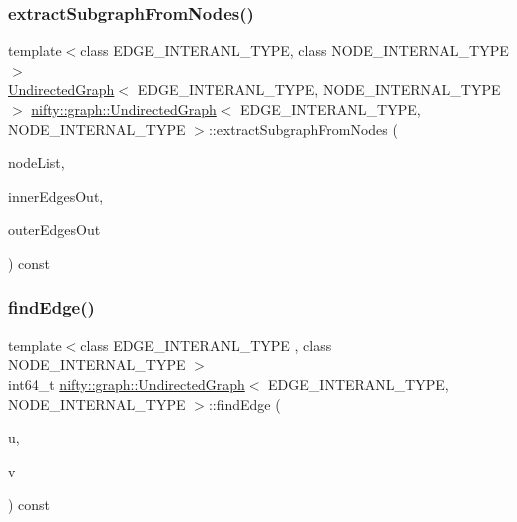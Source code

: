 \subsubsection{\texorpdfstring{extract\+Subgraph\+From\+Nodes()}{extractSubgraphFromNodes()}}
{\footnotesize\ttfamily template$<$class E\+D\+G\+E\+\_\+\+I\+N\+T\+E\+R\+A\+N\+L\+\_\+\+T\+Y\+PE, class N\+O\+D\+E\+\_\+\+I\+N\+T\+E\+R\+N\+A\+L\+\_\+\+T\+Y\+PE$>$ \\
\hyperlink{classnifty_1_1graph_1_1UndirectedGraph}{Undirected\+Graph}$<$ E\+D\+G\+E\+\_\+\+I\+N\+T\+E\+R\+A\+N\+L\+\_\+\+T\+Y\+PE, N\+O\+D\+E\+\_\+\+I\+N\+T\+E\+R\+N\+A\+L\+\_\+\+T\+Y\+PE $>$ \hyperlink{classnifty_1_1graph_1_1UndirectedGraph}{nifty\+::graph\+::\+Undirected\+Graph}$<$ E\+D\+G\+E\+\_\+\+I\+N\+T\+E\+R\+A\+N\+L\+\_\+\+T\+Y\+PE, N\+O\+D\+E\+\_\+\+I\+N\+T\+E\+R\+N\+A\+L\+\_\+\+T\+Y\+PE $>$\+::extract\+Subgraph\+From\+Nodes (\begin{DoxyParamCaption}\item[{const \hyperlink{classandres_1_1View}{marray\+::\+View}$<$ N\+O\+D\+E\+\_\+\+I\+N\+T\+E\+R\+N\+A\+L\+\_\+\+T\+Y\+PE $>$ \&}]{node\+List,  }\item[{std\+::vector$<$ E\+D\+G\+E\+\_\+\+I\+N\+T\+E\+R\+A\+N\+L\+\_\+\+T\+Y\+PE $>$ \&}]{inner\+Edges\+Out,  }\item[{std\+::vector$<$ E\+D\+G\+E\+\_\+\+I\+N\+T\+E\+R\+A\+N\+L\+\_\+\+T\+Y\+PE $>$ \&}]{outer\+Edges\+Out }\end{DoxyParamCaption}) const}

\mbox{\label{classnifty_1_1graph_1_1UndirectedGraph_aa7b79785e3030d9a629987e3c5854d11}} 
\subsubsection{\texorpdfstring{find\+Edge()}{findEdge()}}
{\footnotesize\ttfamily template$<$class E\+D\+G\+E\+\_\+\+I\+N\+T\+E\+R\+A\+N\+L\+\_\+\+T\+Y\+PE , class N\+O\+D\+E\+\_\+\+I\+N\+T\+E\+R\+N\+A\+L\+\_\+\+T\+Y\+PE $>$ \\
int64\+\_\+t \hyperlink{classnifty_1_1graph_1_1UndirectedGraph}{nifty\+::graph\+::\+Undirected\+Graph}$<$ E\+D\+G\+E\+\_\+\+I\+N\+T\+E\+R\+A\+N\+L\+\_\+\+T\+Y\+PE, N\+O\+D\+E\+\_\+\+I\+N\+T\+E\+R\+N\+A\+L\+\_\+\+T\+Y\+PE $>$\+::find\+Edge (\begin{DoxyParamCaption}\item[{const int64\+\_\+t}]{u,  }\item[{const int64\+\_\+t}]{v }\end{DoxyParamCaption}) const}

